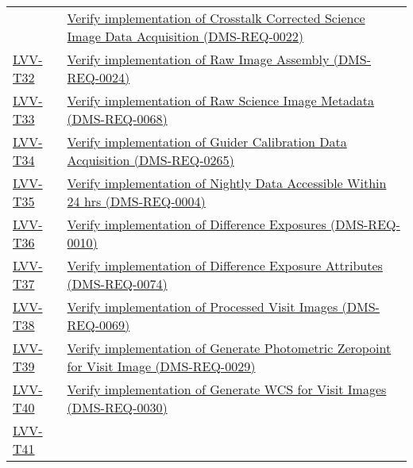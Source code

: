 \begin{longtable}[]{p{3cm}p{13cm}}
&
\href{https://jira.lsstcorp.org/secure/Tests.jspa\#/testCase/LVV-T31}{Verify
implementation of Crosstalk Corrected Science Image Data Acquisition
(DMS-REQ-0022)}\tabularnewline
\protect\hyperlink{lvv-t32---verify-implementation-of-raw-image-assembly-dms-req-0024}{LVV-T32}
&
\href{https://jira.lsstcorp.org/secure/Tests.jspa\#/testCase/LVV-T32}{Verify
implementation of Raw Image Assembly (DMS-REQ-0024)}\tabularnewline
\protect\hyperlink{lvv-t33---verify-implementation-of-raw-science-image-metadata-dms-req-0068}{LVV-T33}
&
\href{https://jira.lsstcorp.org/secure/Tests.jspa\#/testCase/LVV-T33}{Verify
implementation of Raw Science Image Metadata
(DMS-REQ-0068)}\tabularnewline
\protect\hyperlink{lvv-t34---verify-implementation-of-guider-calibration-data-acquisition-dms-req-0265}{LVV-T34}
&
\href{https://jira.lsstcorp.org/secure/Tests.jspa\#/testCase/LVV-T34}{Verify
implementation of Guider Calibration Data Acquisition
(DMS-REQ-0265)}\tabularnewline
\protect\hyperlink{lvv-t35---verify-implementation-of-nightly-data-accessible-within-24-hrs-dms-req-0004}{LVV-T35}
&
\href{https://jira.lsstcorp.org/secure/Tests.jspa\#/testCase/LVV-T35}{Verify
implementation of Nightly Data Accessible Within 24 hrs
(DMS-REQ-0004)}\tabularnewline
\protect\hyperlink{lvv-t36---verify-implementation-of-difference-exposures--dms-req-0010}{LVV-T36}
&
\href{https://jira.lsstcorp.org/secure/Tests.jspa\#/testCase/LVV-T36}{Verify
implementation of Difference Exposures (DMS-REQ-0010)}\tabularnewline
\protect\hyperlink{lvv-t37---verify-implementation-of-difference-exposure-attributes-dms-req-0074}{LVV-T37}
&
\href{https://jira.lsstcorp.org/secure/Tests.jspa\#/testCase/LVV-T37}{Verify
implementation of Difference Exposure Attributes
(DMS-REQ-0074)}\tabularnewline
\protect\hyperlink{lvv-t38---verify-implementation-of-processed-visit-images-dms-req-0069}{LVV-T38}
&
\href{https://jira.lsstcorp.org/secure/Tests.jspa\#/testCase/LVV-T38}{Verify
implementation of Processed Visit Images (DMS-REQ-0069)}\tabularnewline
\protect\hyperlink{lvv-t39---verify-implementation-of-generate-photometric-zeropoint-for-visit-image-dms-req-0029}{LVV-T39}
&
\href{https://jira.lsstcorp.org/secure/Tests.jspa\#/testCase/LVV-T39}{Verify
implementation of Generate Photometric Zeropoint for Visit Image
(DMS-REQ-0029)}\tabularnewline
\protect\hyperlink{lvv-t40---verify-implementation-of-generate-wcs-for-visit-images-dms-req-0030}{LVV-T40}
&
\href{https://jira.lsstcorp.org/secure/Tests.jspa\#/testCase/LVV-T40}{Verify
implementation of Generate WCS for Visit Images
(DMS-REQ-0030)}\tabularnewline
\protect\hyperlink{lvv-t41---verify-implementation-of-generate-psf-for-visit-images-dms-req-0070}{LVV-T41}

\end{longtable}
